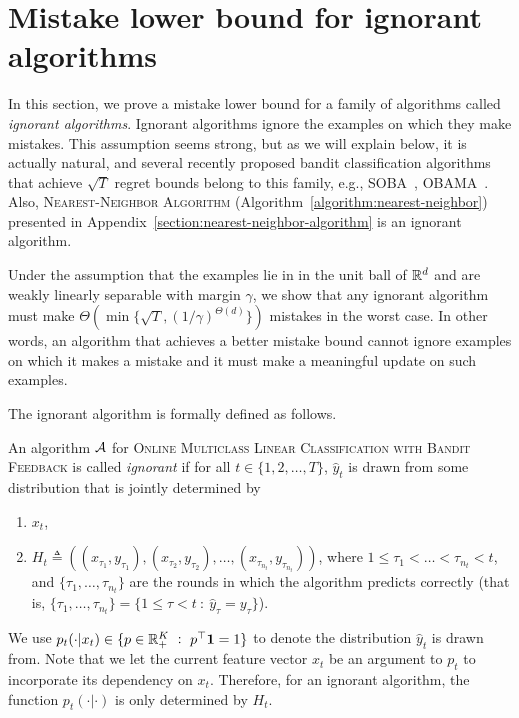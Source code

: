 \section{Mistake lower bound for ignorant algorithms}
\label{section:mistake-lower-bound-for-ignorant-algorithms}

In this section, we prove a mistake lower bound for a family of algorithms
called \textit{ignorant algorithms}. Ignorant algorithms ignore the examples on
which they make mistakes. This assumption seems strong, but as we will explain
below, it is actually natural, and several recently proposed bandit
classification algorithms that achieve $\sqrt{T}$ regret bounds belong to
this family, e.g., SOBA~\citep{Beygelzimer-Orabona-Zhang-2017},
OBAMA~\citep{Foster-Kale-Luo-Mohri-Sridharan-2018}. Also,
\textsc{Nearest-Neighbor Algorithm} (Algorithm~\ref{algorithm:nearest-neighbor})
presented in Appendix~\ref{section:nearest-neighbor-algorithm} is an ignorant
algorithm.

Under the assumption that the examples lie in in the unit ball of $\mathbb{R}^d$ and are
weakly linearly separable with margin $\gamma$, we show that any ignorant
algorithm must make $\Theta\left(\min\{\sqrt{T},
(1/\gamma)^{\Theta(d)}\}\right)$ mistakes in the worst case. In other words, an
algorithm that achieves a better mistake bound cannot ignore examples on which
it makes a mistake and it must make a meaningful update on such examples.

The ignorant algorithm is formally defined as follows.
\begin{definition}
\label{definition:ignorant-algorithm}
An algorithm $\mathcal{A}$ for \textsc{Online Multiclass Linear Classification with
Bandit Feedback} is called \emph{ignorant} if for all $t \in \{1,2,\dots,T\}$,
$\widehat y_t$ is drawn from some distribution that is jointly determined by
\begin{enumerate}
\item $x_t$,
\item $H_t \triangleq \left( (x_{\tau_1}, y_{\tau_1}), (x_{\tau_2}, y_{\tau_2}), \ldots, (x_{\tau_{n_t}}, y_{\tau_{n_t}}) \right)$,
where $1 \le \tau_1 < \dots < \tau_{n_t} < t$, and $\{\tau_1, \ldots, \tau_{n_t}\}$
are the rounds in which the algorithm predicts correctly (that is,
$\{\tau_1, \dots, \tau_{n_t}\} = \{1 \le \tau < t ~:~ \widehat y_\tau=y_\tau\}$).
\end{enumerate}
We use $p_t(\cdot|x_t)\in \{p\in \mathbb{R}_+^K ~:~ p^\top\mathbf{1}=1\}$ to denote
the distribution $\widehat y_t$ is drawn from. Note that we let the current
feature vector $x_t$ be an argument to $p_t$ to incorporate its dependency on
$x_t$. Therefore, for an ignorant algorithm, the function $p_t(\cdot|\cdot)$ is
only determined by $H_t$.
\end{definition}

